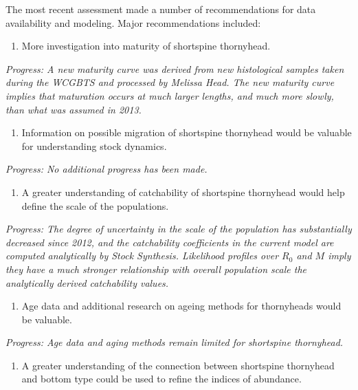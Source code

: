 \documentclass[11pt,
  letterpaper,
]{article}
\providecommand{\tightlist}{%
  \setlength{\itemsep}{0pt}\setlength{\parskip}{0pt}}
\providecommand{\tightlist}{%
  \setlength{\itemsep}{0pt}\setlength{\parskip}{0pt}}
\begin{document}
The most recent assessment made a number of recommendations for data availability and modeling. Major recommendations included:

\begin{enumerate}
\def\labelenumi{\arabic{enumi}.}
\tightlist
\item
  More investigation into maturity of shortspine thornyhead.
\end{enumerate}

\emph{Progress: A new maturity curve was derived from new histological samples taken during the WCGBTS and processed by Melissa Head. The new maturity curve implies that maturation occurs at much larger lengths, and much more slowly, than what was assumed in 2013.}

\begin{enumerate}
\def\labelenumi{\arabic{enumi}.}
\setcounter{enumi}{1}
\tightlist
\item
  Information on possible migration of shortspine thornyhead would be valuable for understanding stock dynamics.
\end{enumerate}

\emph{Progress: No additional progress has been made.}

\begin{enumerate}
\def\labelenumi{\arabic{enumi}.}
\setcounter{enumi}{2}
\tightlist
\item
  A greater understanding of catchability of shortspine thornyhead would help define the scale of the populations.
\end{enumerate}

\emph{Progress: The degree of uncertainty in the scale of the population has substantially decreased since 2012, and the catchability coefficients in the current model are computed analytically by Stock Synthesis. Likelihood profiles over \(R_0\) and \(M\) imply they have a much stronger relationship with overall population scale the analytically derived catchability values.}

\begin{enumerate}
\def\labelenumi{\arabic{enumi}.}
\setcounter{enumi}{3}
\tightlist
\item
  Age data and additional research on ageing methods for thornyheads would be valuable.
\end{enumerate}

\emph{Progress: Age data and aging methods remain limited for shortspine thornyhead.}

\begin{enumerate}
\def\labelenumi{\arabic{enumi}.}
\setcounter{enumi}{4}
\tightlist
\item
  A greater understanding of the connection between shortspine thornyhead and bottom type could be used to refine the indices of abundance.
\end{enumerate}
\end{document}
